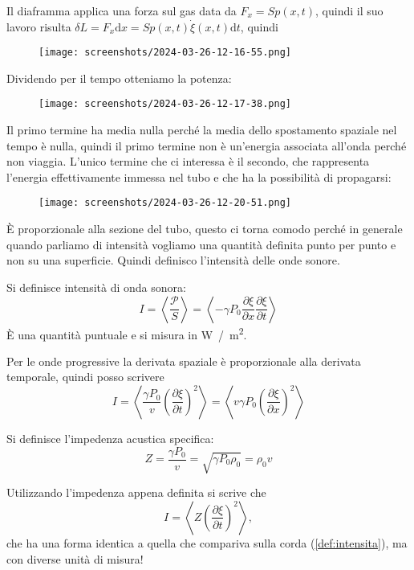 Il diaframma applica una forza sul gas data da \(F_x = S p(x,t)\), quindi il suo lavoro risulta \(\delta L = F_x \mathrm{d} x = S p(x,t) \dot{\xi }(x,t) \mathrm{d} t\), quindi
\begin{figure}[H]
	\centering
	\texttt{[image: screenshots/2024-03-26-12-16-55.png]}
\end{figure}
Dividendo per il tempo otteniamo la potenza:
\begin{figure}[H]
	\centering
	\texttt{[image: screenshots/2024-03-26-12-17-38.png]}
\end{figure}
Il primo termine ha media nulla perché la media dello spostamento spaziale nel tempo è nulla, quindi il primo termine non è un'energia associata all'onda perché non viaggia. L'unico termine che ci interessa è il secondo, che rappresenta l'energia effettivamente immessa nel tubo e che ha la possibilità di propagarsi:
\begin{figure}[H]
	\centering
	\texttt{[image: screenshots/2024-03-26-12-20-51.png]}
\end{figure} 
È proporzionale alla sezione del tubo, questo ci torna comodo perché in generale quando parliamo di intensità vogliamo una quantità definita punto per punto e non su una superficie. Quindi definisco l'intensità delle onde sonore.
\begin{definition}
	Si definisce intensità di onda sonora:
	\begin{equation}
		I = \left\langle \frac{\mathcal{P} }{S} \right\rangle = \left\langle -\gamma P_0 \frac{\partial \xi }{\partial x} \frac{\partial \xi }{\partial t}  \right\rangle 
	\end{equation}
	È una quantità puntuale e si misura in \unit{W / m^2}.
\end{definition}
Per le onde progressive la derivata spaziale è proporzionale alla derivata temporale, quindi posso scrivere
\begin{equation}
	I =\left\langle \frac{\gamma P_0}{v} \left( \frac{\partial \xi }{\partial t}  \right) ^{2}   \right\rangle = \left\langle v \gamma P_0 \left( \frac{\partial \xi }{\partial x}  \right)^{2}   \right\rangle 
\end{equation}
\begin{definition}
	Si definisce l'impedenza acustica specifica:
	\begin{equation}
		Z = \frac{\gamma P_0}{v} = \sqrt{\gamma P_0 \rho _0} =\rho _0 v
	\end{equation}
\end{definition}
Utilizzando l'impedenza appena definita si scrive che
\begin{equation}
	I = \left\langle Z \left( \frac{\partial \xi }{\partial t}  \right) ^{2}  \right\rangle,
\end{equation}
che ha una forma identica a quella che compariva sulla corda (\autoref{def:intensita}), ma con diverse unità di misura!
